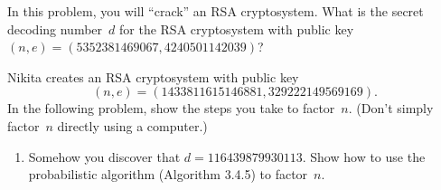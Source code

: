 \documentclass{exam}
\begin{document}
\begin{questions}
\question[10]\label{ex:crypto5}
In this problem, you will ``crack'' an RSA cryptosystem.
What is the secret decoding number~$d$ for the RSA
cryptosystem with public key $(n,e) = (5352381469067, 4240501142039)$?

\question[10] \label{ex:crypto7}
Nikita creates an RSA cryptosystem with public key
$$(n,e)=(1433811615146881, 329222149569169).$$
In the following problem, show the steps you take to factor~$n$.
(Don't simply factor~$n$ directly using a computer.)
\begin{enumerate}
\item
Somehow you discover that $d=116439879930113$.  Show how to use the
probabilistic algorithm (Algorithm 3.4.5) to factor~$n$.
\end{enumerate}


\end{questions}
\end{document}
